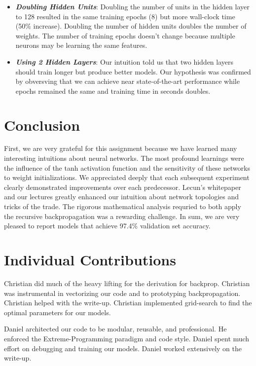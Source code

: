 \documentclass{article} %
\begin{document}
{{\begin{itemize}
\item \textbf{\textit{Doubling Hidden Units}}: Doubling the number of units in the hidden layer to 128 resulted in the same training epochs (8) but more wall-clock time (50\% increase).  Doubling the number of hidden units doubles the number of weights.  The number of training epochs doesn't change because multiple neurons may be learning the same features.  
\item \textbf{\textit{Using 2 Hidden Layers}}: Our intuition told us that two hidden layers should train longer but produce better models.  Our hypothesis was confirmed by obversving that we can achieve near state-of-the-art performance while epochs remained the same and training time in seconds doubles.
\end{itemize}

\section*{Conclusion}

First, we are very grateful for this assignment because we have learned many interesting intuitions about neural networks.  The most profound learnings were the influence of the tanh activation function and the sensitivity of these networks to weight initializations.  We appreciated deeply that each subsequent experiment clearly demonstrated improvements over each predecessor.  Lecun's whitepaper and our lectures greatly enhanced our intuition about network topologies and tricks of the trade.  The rigorous mathematical analysis requried to both apply the recursive backpropagation was a rewarding challenge.  In sum, we are very pleased to report models that achieve 97.4\% validation set accuracy.  


\section*{Individual Contributions}

Christian did much of the heavy lifting for the derivation for backprop.  Christian was instrumental in vectorizing our code and to prototyping backpropagation.  Christian helped with the write-up.  Christian implemented grid-search to find the optimal parameters for our models.  

Daniel architected our code to be modular, reusable, and professional.  He enforced the Extreme-Programming paradigm and code style.  Daniel spent much effort on debugging and training our models.  Daniel worked extensively on the write-up.  



}}
\end{document}
